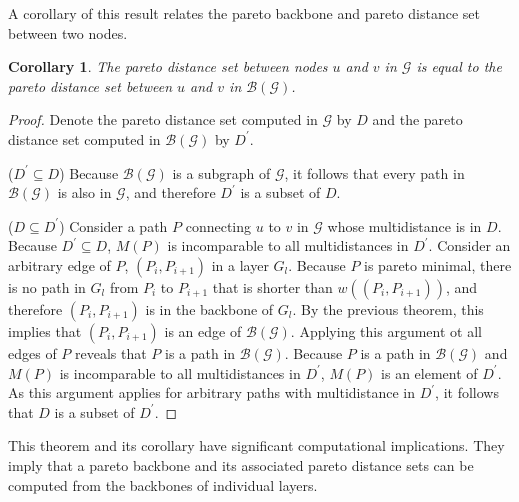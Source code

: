 \documentclass{article}
\newtheorem{corollary}{Corollary}[theorem]
\begin{document}
A corollary of this result relates the pareto backbone and pareto distance set between two nodes.

\begin{corollary}
    The pareto distance set between nodes $u$ and $v$ in $\mathcal{G}$ is equal to the pareto distance
    set between $u$ and $v$ in $\mathcal{B}(\mathcal{G})$.
\end{corollary}
\begin{proof}
    Denote the pareto distance set computed in $\mathcal{G}$ by $D$ and the pareto distance set computed
    in $\mathcal{B}(\mathcal{G})$ by $D^\prime$. 
    
    ($D^\prime\subseteq D$) Because $\mathcal{B}(\mathcal{G})$ is a subgraph of
    $\mathcal{G}$, it follows that every path in $\mathcal{B}(\mathcal{G})$ is also in $\mathcal{G}$, and
    therefore $D^\prime$ is a subset of $D$.

    ($D\subseteq D^\prime$) Consider a path $P$ connecting $u$ to $v$ in $\mathcal{G}$ whose
    multidistance is in $D$. Because $D^\prime\subseteq D$, $M(P)$ is incomparable to
    all multidistances in $D^\prime$. Consider an arbitrary edge of $P$, $(P_i,P_{i+1})$
    in a layer $G_l$. Because $P$ is pareto minimal, there is no path in $G_l$ from $P_i$ to
    $P_{i+1}$ that is shorter than $w((P_i,P_{i+1}))$, and therefore $(P_i,P_{i+1})$ is in the backbone
    of $G_l$. By the previous theorem, this implies that $(P_i,P_{i+1})$ is an edge of 
    $\mathcal{B}(\mathcal{G})$. Applying this argument ot all edges of $P$ reveals that $P$ is a path in
    $\mathcal{B}(\mathcal{G})$. Because $P$ is a path in $\mathcal{B}(\mathcal{G})$ and $M(P)$ is 
    incomparable to
    all multidistances in $D^\prime$, $M(P)$ is an element of $D^\prime$. As this argument applies for 
    arbitrary paths with multidistance in $D^\prime$, it follows that $D$ is a subset of
    $D^\prime$.
\end{proof}

This theorem and its corollary have significant computational implications. They imply that a pareto
backbone and its associated pareto distance sets can be computed from the backbones of individual layers.
\end{document}
